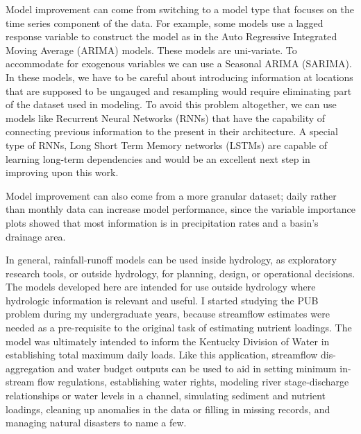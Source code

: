 Model improvement can come from switching to a model type that focuses on the time series component of the data. For example, some models use a lagged response variable to construct the model as in the Auto Regressive Integrated Moving Average (ARIMA) models. These models are uni-variate. To accommodate for exogenous variables we can use a Seasonal ARIMA (SARIMA). In these models, we have to be careful about introducing information at locations that are supposed to be ungauged and resampling would require eliminating part of the dataset used in modeling. To avoid this problem altogether, we can use models like Recurrent Neural Networks (RNNs) that have the capability of connecting previous information to the present in their architecture. A special type of RNNs, Long Short Term Memory networks (LSTMs) are capable of learning long-term dependencies and would be an excellent next step in improving upon this work. 

Model improvement can also come from a more granular dataset; daily rather than monthly data can increase model performance, since the variable importance plots showed that most information is in precipitation rates and a basin's drainage area. 

In general, rainfall-runoff models can be used inside hydrology, as exploratory research tools, or outside hydrology, for planning, design, or operational decisions. The models developed here are intended for use outside hydrology where hydrologic information is relevant and useful. I started studying the PUB problem during my undergraduate years, because streamflow estimates were needed as a pre-requisite to the original task of estimating nutrient loadings. The model was ultimately intended to inform the Kentucky Division of Water in establishing total maximum daily loads. Like this application, streamflow dis-aggregation and water budget outputs can be used to aid in setting minimum in-stream flow regulations, establishing water rights, modeling river stage-discharge relationships or water levels in a channel, simulating sediment and nutrient loadings, cleaning up anomalies in the data or filling in missing records, and managing natural disasters to name a few. 


